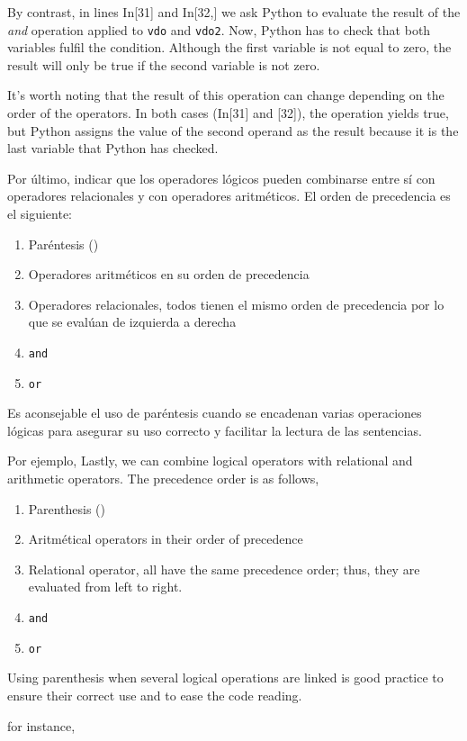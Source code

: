 \begin{paracol}{2}
By contrast, in lines In[31] and In[32,] we ask Python to evaluate the result of the \emph{and} operation applied to \texttt{vdo} and \texttt{vdo2}. Now, Python has to check that both variables fulfil the condition. Although the first variable is not equal to zero, the result will only be true if the second variable is not zero.

It's worth noting that the result of this operation can change depending on the order of the operators. In both cases (In[31] and [32]), the operation yields true, but Python assigns the value of the second operand as the result because it is the last variable that Python has checked.
\end{paracol}

\begin{paracol}{2}
Por último, indicar que los operadores lógicos pueden combinarse entre sí con operadores relacionales y con operadores aritméticos. El orden de precedencia es el siguiente:
\begin{enumerate}
\item  Paréntesis ()
\item  Operadores aritméticos en su orden de precedencia
\item  Operadores relacionales, todos tienen el mismo orden de precedencia por lo que se evalúan de izquierda a derecha
\item \texttt{and}
\item \texttt{or}
\end{enumerate}

Es aconsejable el uso de paréntesis cuando se encadenan varias operaciones lógicas para asegurar su uso correcto y facilitar la lectura de las sentencias.

Por ejemplo,
\switchcolumn
Lastly, we can combine logical operators with relational and arithmetic operators. The precedence order is as follows,
\begin{enumerate}
\item  Parenthesis ()
\item  Aritmétical operators in their order of precedence
\item  Relational operator, all have the same precedence order; thus, they are evaluated from left to right.
\item \texttt{and}
\item \texttt{or}
\end{enumerate}

Using parenthesis when several logical operations are linked is good practice to ensure their correct use and to ease the code reading.  

for instance,
\end{paracol} 
